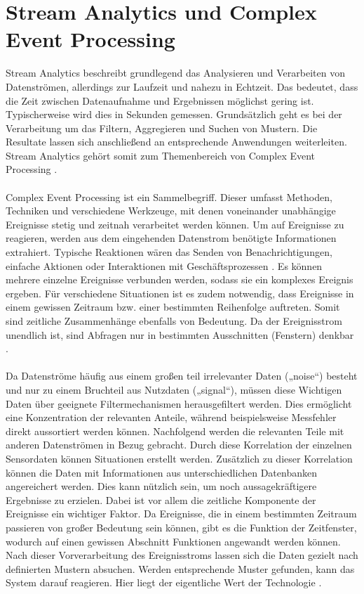 \section{Stream Analytics und Complex Event Processing}
Stream Analytics beschreibt grundlegend das Analysieren und Verarbeiten von Datenströmen, allerdings zur Laufzeit und nahezu in Echtzeit. Das bedeutet, dass die Zeit zwischen Datenaufnahme und Ergebnissen möglichst gering ist. Typischerweise wird dies in Sekunden gemessen. Grundsätzlich geht es bei der Verarbeitung um das Filtern, Aggregieren und Suchen von Mustern. Die Resultate lassen sich anschließend an entsprechende Anwendungen weiterleiten. Stream Analytics gehört somit zum Themenbereich von Complex Event Processing \cite{GesellschaftfurInformatik.2009}.\\ \\ 
Complex Event Processing ist ein Sammelbegriff. Dieser umfasst Methoden, Techniken und verschiedene Werkzeuge, mit denen voneinander unabhängige Ereignisse stetig und zeitnah verarbeitet werden können. Um auf Ereignisse zu reagieren, werden aus dem eingehenden Datenstrom benötigte Informationen extrahiert. Typische Reaktionen wären das Senden von Benachrichtigungen, einfache Aktionen oder Interaktionen mit Geschäftsprozessen \cite{GesellschaftfurInformatik.2009}. Es können mehrere einzelne Ereignisse verbunden werden, sodass sie ein komplexes Ereignis ergeben. Für verschiedene Situationen ist es zudem notwendig, dass Ereignisse in einem gewissen Zeitraum bzw. einer bestimmten Reihenfolge auftreten. Somit sind zeitliche Zusammenhänge ebenfalls von Bedeutung. Da der Ereignisstrom unendlich ist, sind Abfragen nur in bestimmten Ausschnitten (Fenstern) denkbar \cite{GesellschaftfurInformatik.2009}. \\ \\
Da Datenströme häufig aus einem großen teil irrelevanter Daten („noise“) besteht und nur zu einem Bruchteil aus Nutzdaten („signal“), müssen diese Wichtigen Daten über geeignete Filtermechanismen herausgefiltert werden. Dies ermöglicht eine Konzentration der relevanten Anteile, während beispielsweise Messfehler direkt aussortiert werden können. Nachfolgend werden die relevanten Teile mit anderen Datenströmen in Bezug gebracht. Durch diese Korrelation der einzelnen Sensordaten können Situationen erstellt werden. Zusätzlich zu dieser Korrelation können die Daten mit Informationen aus unterschiedlichen Datenbanken angereichert werden. Dies kann nützlich sein, um noch aussagekräftigere Ergebnisse zu erzielen. Dabei ist vor allem die zeitliche Komponente der Ereignisse ein wichtiger Faktor. Da Ereignisse, die in einem bestimmten Zeitraum passieren von großer Bedeutung sein können, gibt es die Funktion der Zeitfenster, wodurch auf einen gewissen Abschnitt Funktionen angewandt werden können. Nach dieser Vorverarbeitung des Ereignisstroms lassen sich die Daten gezielt nach definierten Mustern absuchen. Werden entsprechende Muster gefunden, kann das System darauf reagieren. Hier liegt der eigentliche Wert der Technologie \cite{Bruening.2016}.



\ifCLASSOPTIONcaptionsoff
  \newpage
\fi